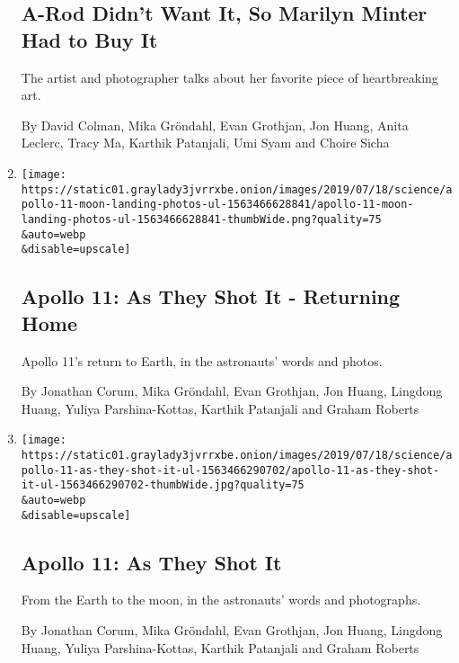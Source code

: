 \begin{enumerate}
  \hypertarget{a-rod-didnt-want-it-so-marilyn-minter-had-to-buy-it}{%
  \subsection{A-Rod Didn't Want It, So Marilyn Minter Had to Buy
  It}\label{a-rod-didnt-want-it-so-marilyn-minter-had-to-buy-it}}

  The artist and photographer talks about her favorite piece of
  heartbreaking art.

  By David Colman, Mika Gröndahl, Evan Grothjan, Jon Huang, Anita
  Leclerc, Tracy Ma, Karthik Patanjali, Umi Syam and Choire Sicha
\item
  \href{/interactive/2019/07/18/science/apollo-11-moon-earth-photos-ul.html}{}

  \texttt{[image: https://static01.graylady3jvrrxbe.onion/images/2019/07/18/science/apollo-11-moon-landing-photos-ul-1563466628841/apollo-11-moon-landing-photos-ul-1563466628841-thumbWide.png?quality=75\\\&auto=webp\\\&disable=upscale]}

  \hypertarget{apollo-11-as-they-shot-it---returning-home}{%
  \subsection{Apollo 11: As They Shot It - Returning
  Home}\label{apollo-11-as-they-shot-it---returning-home}}

  Apollo 11's return to Earth, in the astronauts' words and photos.

  By Jonathan Corum, Mika Gröndahl, Evan Grothjan, Jon Huang, Lingdong
  Huang, Yuliya Parshina-Kottas, Karthik Patanjali and Graham Roberts
\item
  \href{/interactive/2019/07/18/science/apollo-11-as-they-shot-it-ul.html}{}

  \texttt{[image: https://static01.graylady3jvrrxbe.onion/images/2019/07/18/science/apollo-11-as-they-shot-it-ul-1563466290702/apollo-11-as-they-shot-it-ul-1563466290702-thumbWide.jpg?quality=75\\\&auto=webp\\\&disable=upscale]}

  \hypertarget{apollo-11-as-they-shot-it}{%
  \subsection{Apollo 11: As They Shot
  It}\label{apollo-11-as-they-shot-it}}

  From the Earth to the moon, in the astronauts' words and photographs.

  By Jonathan Corum, Mika Gröndahl, Evan Grothjan, Jon Huang, Lingdong
  Huang, Yuliya Parshina-Kottas, Karthik Patanjali and Graham Roberts
\end{enumerate}

